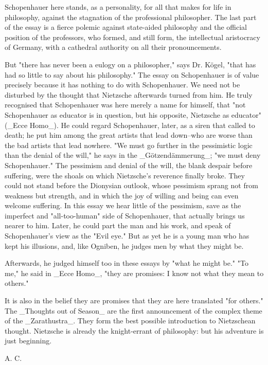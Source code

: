 Schopenhauer here stands, as a personality, for all that makes for
life in philosophy, against the stagnation of the professional
philosopher. The last part of the essay is a fierce polemic against
state-aided philosophy and the official position of the professors,
who formed, and still form, the intellectual aristocracy of Germany,
with a cathedral authority on all their pronouncements.

But "there has never been a eulogy on a philosopher," says Dr. Kögel,
"that has had so little to say about his philosophy." The essay on
Schopenhauer is of value precisely because it has nothing to do with
Schopenhauer. We need not be disturbed by the thought that Nietzsche
afterwards turned from him. He truly recognised that Schopenhauer was
here merely a name for himself, that "not Schopenhauer as educator is
in question, but his opposite, Nietzsche as educator" (_Ecce Homo_).
He could regard Schopenhauer, later, as a siren that called to death;
he put him among the great artists that lead down--who are worse than
the bad artists that lead nowhere. "We must go further in the
pessimistic logic than the denial of the will," he says in the
_Götzendämmerung_; "we must deny Schopenhauer." The pessimism and
denial of the will, the blank despair before suffering, were the
shoals on which Nietzsche's reverence finally broke. They could not
stand before the Dionysian outlook, whose pessimism sprang not from
weakness but strength, and in which the joy of willing and being can
even welcome suffering. In this essay we hear little of the
pessimism, save as the imperfect and "all-too-human" side of
Schopenhauer, that actually brings us nearer to him. Later, he could
part the man and his work, and speak of Schopenhauer's view as the
"Evil eye." But as yet he is a young man who has kept his illusions,
and, like Ogniben, he judges men by what they might be.

Afterwards, he judged himself too in these essays by "what he might
be." "To me," he said in _Ecce Homo_, "they are promises: I know not
what they mean to others."

It is also in the belief they are promises that they are here
translated "for others." The _Thoughts out of Season_ are the first
announcement of the complex theme of the _Zarathustra_. They form the
best possible introduction to Nietzschean thought. Nietzsche is
already the knight-errant of philosophy: but his adventure is just
beginning.

A. C.




